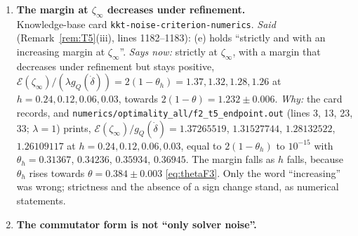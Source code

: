\documentclass[11pt]{article}
\newcommand{\Aop}{\mathbb A}
\begin{document}
\begin{enumerate}[label=C\arabic*,ref=C\arabic*,leftmargin=2.4em,itemsep=3pt]
 (Remark~\ref{rem:T5}(ii)); Prop.~\ref{prop:bdryfun}(5) proves only that
 $-2\sigma_{\zeta_0}=\delta_0\otimes\delta_0$ is not in the form domain of $M_*$ and reports
 that the numerics indicate $\mathcal E(\zeta_0)=+\infty$.  The card states: ``Under H3, if
 $A(\zeta_0,0,0)$ is not in F then alpha = 0 is forced and (e) holds OUTRIGHT \dots; that
 $A(\zeta_0,0,0)$ is not in F \dots\ rests on F2's divergent corner term (rem:T5 (ii)), i.e.\
 it is numerical.''  The implication itself (H3 read in $\mathfrak F$ and
 $\Aop(\zeta_0,0,0)\notin\mathfrak F$ imply (e)) is proved by Remark~\ref{rem:H3space} and
 stays in the list.  The same proviso (``given $\Aop(\zeta_0,0,0)\notin\mathfrak F$,
 numerical'') was added, by one-line replacements, wherever the document invokes it for
 ``$\alpha=0$ is forced'' or ``(e) holds outright under H3'': line 1091
 (Prop.~\ref{prop:bdryfun}(5)); lines 1210 and 1213 (Remark~\ref{rem:H3space}; line 1213
 also says that Prop.~\ref{prop:bdryfun}(5) proves only that $\delta_0\otimes\delta_0$ is
 outside the form domain of $M_*$, the claim $\Aop(\zeta_0,0,0)\notin\mathfrak F$ resting on
 F2's divergent corner term, Remark~\ref{rem:T5}(ii)); lines 1232 and 1257
 (Remark~\ref{rem:H3}); line 1619 (\S\ref{sec:summary}, Conditional, H3).
\item\label{corr0924:C5} \textbf{The margin at $\zeta_\infty$ decreases under refinement.}\\
 Knowledge-base card \texttt{kkt-noise-criterion-numerics}.
 \emph{Said} (Remark~\ref{rem:T5}(iii), lines 1182--1183): (e) holds ``strictly and with an
 increasing margin at $\zeta_\infty$''.
 \emph{Says now:} strictly at $\zeta_\infty$, with a margin that decreases under refinement
 but stays positive, $\mathcal E(\zeta_\infty)/(\lambda g_Q(\dot\delta))=2(1-\theta_h)=1.37,
 1.32,1.28,1.26$ at $h=0.24,0.12,0.06,0.03$, towards $2(1-\theta)=1.232\pm0.006$.
 \emph{Why:} the card records, and
 \texttt{numerics/optimality\_all/f2\_t5\_endpoint.out} (lines 3, 13, 23, 33; $\lambda=1$)
 prints, $\mathcal E(\zeta_\infty)/g_Q(\dot\delta)=1.37265519$, $1.31527744$, $1.28132522$,
 $1.26109117$ at $h=0.24,0.12,0.06,0.03$, equal to $2(1-\theta_h)$ to $10^{-15}$ with
 $\theta_h=0.31367$, $0.34236$, $0.35934$, $0.36945$.  The margin falls as $h$ falls, because
 $\theta_h$ rises towards $\theta=0.384\pm0.003$ \eqref{eq:thetaF3}.  Only the word
 ``increasing'' was wrong; strictness and the absence of a sign change stand, as numerical
 statements.
\item\label{corr0924:C6} \textbf{The commutator form is not ``only solver noise''.}\\

\end{enumerate}
\end{document}
